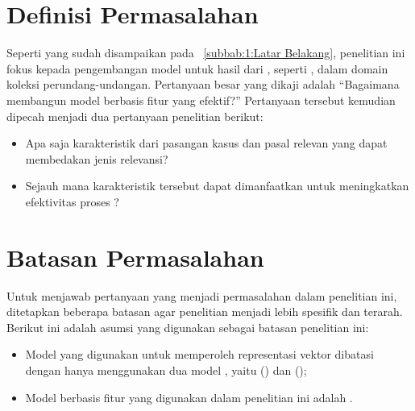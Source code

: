 \section{Definisi Permasalahan}
\label{subbab:1:Definisi Permasalahan}
Seperti yang sudah disampaikan pada \subbab~\ref{subbab:1:Latar Belakang}, penelitian ini fokus kepada pengembangan model untuk \reranking{} hasil dari \sparse{} \retrieval{}, seperti \obm{}, dalam domain koleksi perundang-undangan. Pertanyaan besar yang dikaji adalah ``Bagaimana membangun model \reranking{} berbasis fitur yang efektif?'' Pertanyaan tersebut kemudian dipecah menjadi dua pertanyaan penelitian berikut:
\begin{itemize} [topsep=0pt, itemsep=-1ex, partopsep=1ex, parsep=1ex]
    \item Apa saja karakteristik dari pasangan kasus dan pasal relevan yang dapat membedakan jenis relevansi?
    \item Sejauh mana karakteristik tersebut dapat dimanfaatkan untuk meningkatkan efektivitas proses \retrieval{}?
\end{itemize}





\section{Batasan Permasalahan}
\label{subbab:1:Batasan Permasalahan}
Untuk menjawab pertanyaan yang menjadi permasalahan dalam penelitian ini, ditetapkan beberapa batasan agar penelitian menjadi lebih spesifik dan terarah. Berikut ini adalah asumsi yang digunakan sebagai batasan penelitian ini:
\begin{itemize} [topsep=0pt, itemsep=-1ex, partopsep=1ex, parsep=1ex]
    \item Model yang digunakan untuk memperoleh representasi vektor dibatasi dengan hanya menggunakan dua model \transformer{}, yaitu \lbert{} (\bert{}) dan \ttttt{} (\tfive{});
    \item Model \reranker{} berbasis fitur yang digunakan dalam penelitian ini adalah \lambdamart{}.
\end{itemize}





